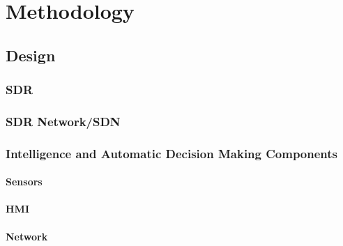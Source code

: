 
\chapter{Methodology} %

\label{Chapter3} %




\section{Design}

\subsection{SDR}

\subsection{SDR Network/SDN}

\subsection{Intelligence and Automatic Decision Making Components}

\subsubsection{Sensors}

\subsubsection{HMI}

\subsubsection{Network}

